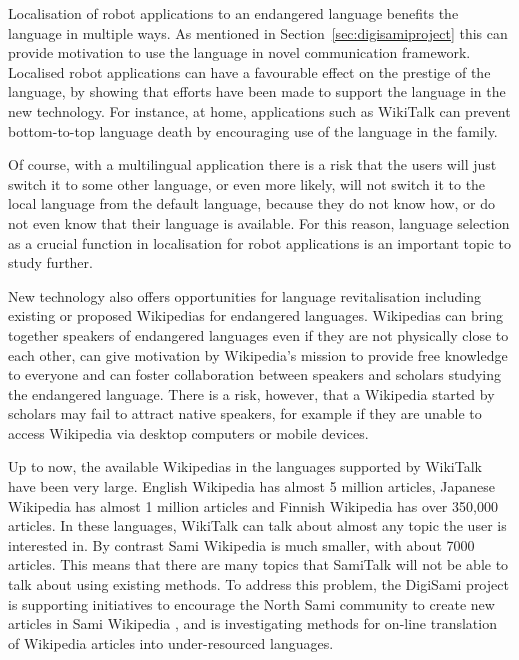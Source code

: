\documentclass[runningheads,a4paper]{llncs}
\begin{document}
Localisation \cite{Laxstrom:ea:IWSDS:16} of robot applications to an endangered language benefits the language in multiple ways. As mentioned in Section~\ref{sec:digisamiproject} this can provide motivation to use the language in novel communication framework. Localised robot applications can have a favourable effect on the prestige of the language, by showing that efforts have been made to support the language in the new technology.
For instance, at home, applications such as WikiTalk can prevent bottom-to-top language death by encouraging use of the language in the family.

Of course, with a multilingual application there is a risk that the users will just switch it to some other language, or even more likely, will not switch it to the local language from the default language, because they do not know how, or do not even know that their language is available. For this reason, language selection as a crucial function in localisation \cite{Laxstrom:ea:IWSDS:16} for robot applications is an important topic to study further.

New technology also offers opportunities for language revitalisation including existing or proposed Wikipedias for endangered languages. Wikipedias can bring together speakers of endangered languages even if they are not physically close to each other, can give motivation by Wikipedia's mission to provide free knowledge to everyone \cite{Wikipedia:motivation}
and can foster collaboration between speakers and scholars studying the endangered language. There is a risk, however, that a Wikipedia started by scholars may fail to attract native speakers, for example if they are unable to access Wikipedia via desktop computers or mobile devices.

Up to now, the available Wikipedias in the languages supported by WikiTalk have been very large. English Wikipedia has almost 5 million articles, Japanese Wikipedia has almost 1 million articles and Finnish Wikipedia has over 350,000 articles. In these languages, WikiTalk can talk about almost any topic the user is interested in. By contrast Sami Wikipedia is much smaller, with about 7000 articles.
This means that there are many topics that SamiTalk will not be able to talk about using existing methods. To address this problem, the DigiSami project is supporting initiatives to encourage the North Sami community to create new articles in Sami Wikipedia \cite{Jokinen:Wilcock:SLTU:14}, and is investigating methods for on-line translation of Wikipedia articles \cite{Laxstrom:ea:EAMT:15} into under-resourced languages.
\end{document}
